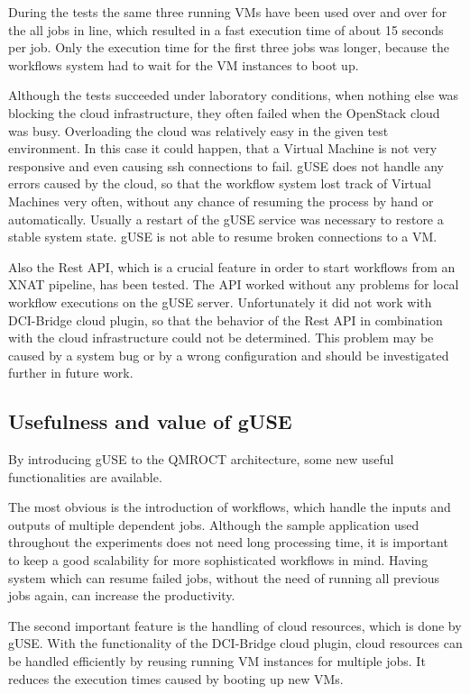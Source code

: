 During the tests the same three running VMs have been used over and over for the all jobs in line, which resulted in a fast execution time of about 15 seconds per job.
Only the execution time for the first three jobs was longer, because the workflows system had to wait for the VM instances to boot up.

Although the tests succeeded under laboratory conditions, when nothing else was blocking the cloud infrastructure, they often failed when the OpenStack cloud was busy.
Overloading the cloud was relatively easy in the given test environment.
In this case it could happen, that a Virtual Machine is not very responsive and even causing ssh connections to fail.
gUSE does not handle any errors caused by the cloud, so that the workflow system lost track of Virtual Machines very often, without any chance of resuming the process by hand or automatically.
Usually a restart of the gUSE service was necessary to restore a stable system state.
gUSE is not able to resume broken connections to a VM.

Also the Rest API, which is a crucial feature in order to start workflows from an XNAT pipeline, has been tested.
The API worked without any problems for local workflow executions on the gUSE server.
Unfortunately it did not work with DCI-Bridge cloud plugin, so that the behavior of the Rest API in combination with the cloud infrastructure could not be determined.
This problem may be caused by a system bug or by a wrong configuration and should be investigated further in future work.

\subsection{Usefulness and value of gUSE}\label{usefulness}

By introducing gUSE to the QMROCT architecture, some new useful functionalities are available.

The most obvious is the introduction of workflows, which handle the inputs and outputs of multiple dependent jobs.
Although the sample application used throughout the experiments does not need long processing time, it is important to keep a good scalability for more sophisticated workflows in mind.
Having system which can resume failed jobs, without the need of running all previous jobs again, can increase the productivity.
 
The second important feature is the handling of cloud resources, which is done by gUSE.
With the functionality of the DCI-Bridge cloud plugin, cloud resources can be handled efficiently by reusing running VM instances for multiple jobs. It reduces the execution times caused by booting up new VMs.

